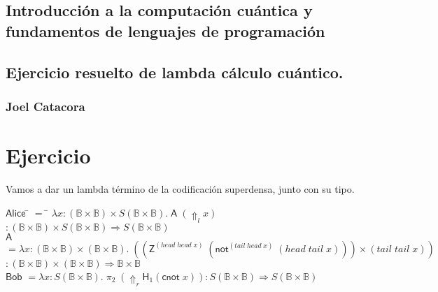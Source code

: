 \documentclass[a4paper,11pt]{article}
\title{}
\author{}
\begin{document}
\maketitle 

\thispagestyle{empty}
\begin{center}
\section*{Introducción a  la computación cuántica y fundamentos de lenguajes de programación} 
\subsection*{Ejercicio resuelto de lambda cálculo cuántico.}
\subsubsection*{Joel Catacora}

\end{center}

\newpage{\pagestyle{empty}\cleardoublepage}

\newpage

\section*
{Ejercicio}

Vamos a dar un lambda término de la codificación superdensa, junto con su tipo.

\begin{tabbing}
  $\textsf{Alice}$ \= $=$ \= $\lambda x : (\mathds{B} \times \mathds{B}) \times S (\mathds{B} \times \mathds{B}). 
  \; \textsf{A} \; (\Uparrow_{l} x)$ \\
  
  \> \> $: (\mathds{B} \times  \mathds{B}) \times S(\mathds{B} \times \mathds{B}) \Rightarrow S(\mathds{B} \times \mathds{B})$ \\

  $\textsf{A}$ \> $= \lambda x: (\mathds{B} \times \mathds{B}) \times (\mathds{B} \times \mathds{B}). \; ((\textsf{Z}^{(head \; head \; x)}\; 
  (\textsf{not}^{(tail \; head \; x)} \; (head \; tail \; x))) \times (tail \; tail \; x))$ \\

  \> \> $: (\mathds{B} \times  \mathds{B}) \times (\mathds{B} \times  \mathds{B}) \Rightarrow \mathds{B} \times \mathds{B}$ \\

  $\textsf{Bob}$ \> $= \lambda x : S(\mathds{B} \times \mathds{B}). \; \pi_{2} \; (\Uparrow_{r} \textsf{H}_{1} (\textsf{cnot} \; x)) 
  : S(\mathds{B} \times \mathds{B}) \Rightarrow S(\mathds{B} \times \mathds{B})$
\end{tabbing}
\end{document}
